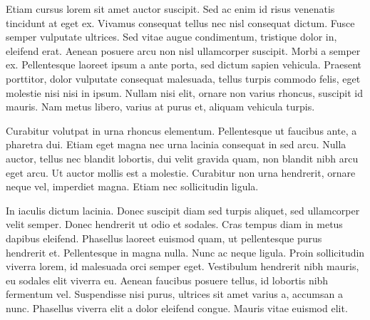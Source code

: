 \documentclass[landscape]{book}
\begin{document}
Etiam cursus lorem sit amet auctor suscipit. Sed ac enim id risus venenatis tincidunt at eget ex. Vivamus consequat tellus nec nisl consequat dictum. Fusce semper vulputate ultrices. Sed vitae augue condimentum, tristique dolor in, eleifend erat. Aenean posuere arcu non nisl ullamcorper suscipit. Morbi a semper ex. Pellentesque laoreet ipsum a ante porta, sed dictum sapien vehicula. Praesent porttitor, dolor vulputate consequat malesuada, tellus turpis commodo felis, eget molestie nisi nisi in ipsum. Nullam nisi elit, ornare non varius rhoncus, suscipit id mauris. Nam metus libero, varius at purus et, aliquam vehicula turpis.

Curabitur volutpat in urna rhoncus elementum. Pellentesque ut faucibus ante, a pharetra dui. Etiam eget magna nec urna lacinia consequat in sed arcu. Nulla auctor, tellus nec blandit lobortis, dui velit gravida quam, non blandit nibh arcu eget arcu. Ut auctor mollis est a molestie. Curabitur non urna hendrerit, ornare neque vel, imperdiet magna. Etiam nec sollicitudin ligula.

In iaculis dictum lacinia. Donec suscipit diam sed turpis aliquet, sed ullamcorper velit semper. Donec hendrerit ut odio et sodales. Cras tempus diam in metus dapibus eleifend. Phasellus laoreet euismod quam, ut pellentesque purus hendrerit et. Pellentesque in magna nulla. Nunc ac neque ligula. Proin sollicitudin viverra lorem, id malesuada orci semper eget. Vestibulum hendrerit nibh mauris, eu sodales elit viverra eu. Aenean faucibus posuere tellus, id lobortis nibh fermentum vel. Suspendisse nisi purus, ultrices sit amet varius a, accumsan a nunc. Phasellus viverra elit a dolor eleifend congue. Mauris vitae euismod elit.
\end{document}

